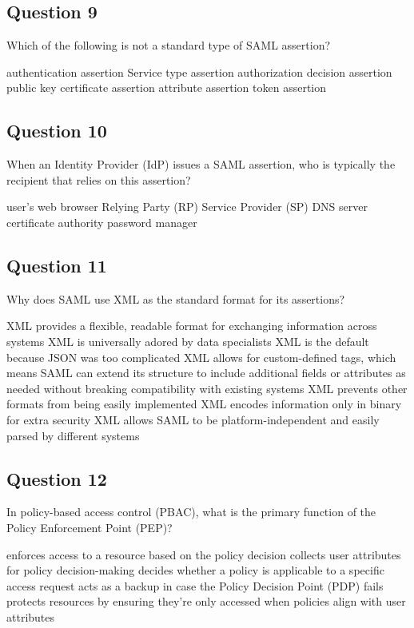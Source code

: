 \subsection*{Question 9}
Which of the following is not a standard type of SAML assertion?
\begin{itemize}
  \incorrect  authentication assertion
  \correct  Service type assertion
  \incorrect  authorization decision assertion 
  \correct  public key certificate assertion 
  \incorrect  attribute assertion
  \correct  token assertion
\end{itemize}

\subsection*{Question 10}
When an Identity Provider (IdP) issues a SAML assertion, who is
typically the recipient that relies on this assertion?
\begin{itemize}
  \incorrect user's web browser
  \correct Relying Party (RP)
  \correct Service Provider (SP)
  \incorrect DNS server
  \incorrect certificate authority 
  \incorrect password manager
\end{itemize}

\subsection*{Question 11}
Why does SAML use XML as the standard format for its assertions?
\begin{itemize}
  \correct  XML provides a flexible, readable format for exchanging
  information across systems
  \incorrect  XML is universally adored by data specialists 
  \incorrect  XML is the default because JSON was too complicated
  \correct  XML allows for custom-defined tags, which means SAML can
  extend its structure to include additional fields or attributes as
  needed without breaking compatibility with existing systems
  \incorrect  XML prevents other formats from being easily implemented 
  \incorrect  XML encodes information only in binary for extra security
  \correct  XML allows SAML to be platform-independent and easily
  parsed by different systems 
\end{itemize}

\subsection*{Question 12}
In policy-based access control (PBAC), what is the primary function of
the Policy Enforcement Point (PEP)?
\begin{itemize}
  \correct enforces access to a resource based on the policy decision 
  \incorrect collects user attributes for policy decision-making
  \incorrect decides whether a policy is applicable to a specific
  access request
  \incorrect acts as a backup in case the Policy Decision Point (PDP)
  fails
  \incorrect protects resources by ensuring they're only accessed when
  policies align with user attributes
\end{itemize}


